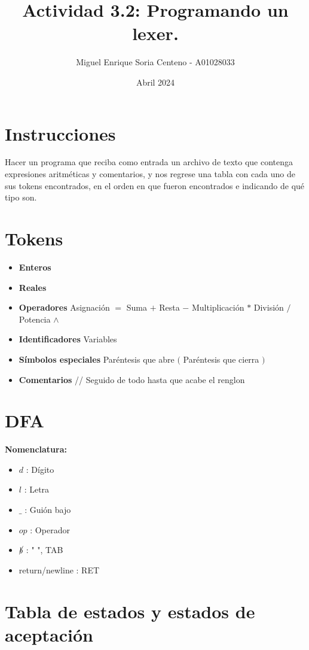 \documentclass{article}
\title{Actividad 3.2: Programando un lexer.}
\author{Miguel Enrique Soria Centeno - A01028033}
\date{Abril 2024}
\begin{document}
\maketitle

\section{Instrucciones}
Hacer un programa que reciba como entrada un archivo de texto que contenga expresiones aritméticas y comentarios, y nos regrese una tabla con cada uno de sus tokens encontrados, en el orden en que fueron encontrados e indicando de qué tipo son. 

\section{Tokens}
\begin{itemize}
  \item \textbf{Enteros}
  \item \textbf{Reales}
  \item \textbf{Operadores}
    \subitem Asignación $=$
    \subitem Suma $+$ 
    \subitem Resta $-$ 
    \subitem Multiplicación $*$ 
    \subitem División $/$ 
    \subitem Potencia $\wedge$ 
  \item \textbf{Identificadores}
    \subitem Variables
  \item \textbf{S\'imbolos especiales} 
    \subitem Paréntesis que abre $($ 
    \subitem Paréntesis que cierra $)$
  \item \textbf{Comentarios}
    \subitem // Seguido de todo hasta que acabe el renglon

\end{itemize}

\section{DFA}
\textbf{Nomenclatura:}
\begin{itemize}
  \item $d$ : Dígito
  \item $l$ : Letra
  \item $\_$ : Guión bajo
  \item $op$ : Operador
  \item $\cancel{b}$ : " ", TAB 
  \item return/newline : RET
\end{itemize}

\section{Tabla de estados y estados de aceptaci\'on}
\end{document}
